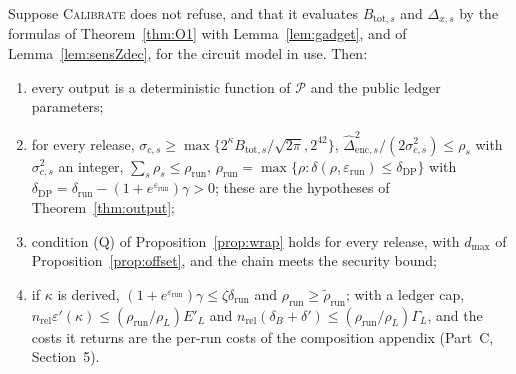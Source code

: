 \begin{proposition}\label{prop:calib}
Suppose \textsc{Calibrate} does not refuse, and that it evaluates $B_{\mathrm{tot},s}$ and $\Delta_{x,s}$ by the formulas of Theorem~\ref{thm:O1} with Lemma~\ref{lem:gadget}, and of Lemma~\ref{lem:sensZdec}, for the circuit model in use. Then:
\begin{enumerate}[nosep,label=(\alph*)]
  \item every output is a deterministic function of $\mathcal P$ and the public ledger parameters;
  \item for every release, $\sigma_{c,s}\ge\max\{2^\kappa B_{\mathrm{tot},s}/\sqrt{2\pi},2^{42}\}$, $\widehat\Delta_{\mathrm{enc},s}^2/(2\sigma_{c,s}^2)\le\rho_s$ with $\sigma_{c,s}^2$ an integer, $\sum_s\rho_s\le\rho_{\mathrm{run}}$, $\rho_{\mathrm{run}}=\max\{\rho:\delta(\rho,\varepsilon_{\mathrm{run}})\le\delta_{\mathrm{DP}}\}$ with $\delta_{\mathrm{DP}}=\delta_{\mathrm{run}}-(1+e^{\varepsilon_{\mathrm{run}}})\gamma>0$; these are the hypotheses of Theorem~\ref{thm:output};
  \item condition (Q) of Proposition~\ref{prop:wrap} holds for every release, with $d_{\max}$ of Proposition~\ref{prop:offset}, and the chain meets the security bound;
  \item if $\kappa$ is derived, $(1+e^{\varepsilon_{\mathrm{run}}})\gamma\le\zeta\delta_{\mathrm{run}}$ and $\rho_{\mathrm{run}}\ge\tilde\rho_{\mathrm{run}}$; with a ledger cap, $n_{\mathrm{rel}}\varepsilon'(\kappa)\le(\rho_{\mathrm{run}}/\rho_L)E'_L$ and $n_{\mathrm{rel}}(\delta_B+\delta')\le(\rho_{\mathrm{run}}/\rho_L)\Gamma_L$, and the costs it returns are the per-run costs of the composition appendix (Part~C, Section~5).
\end{enumerate}
\end{proposition}
